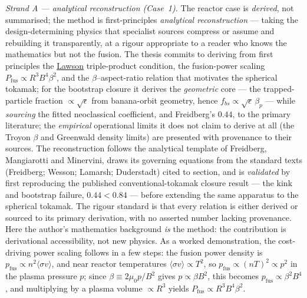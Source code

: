 \documentclass[11pt]{article}
\newcommand{\jl}[2]{\href{#2}{#1}}
\begin{document}
\emph{Strand A --- analytical reconstruction (Case~1).} The reactor case is \emph{derived}, not summarised; the method is first-principles \emph{analytical reconstruction} --- taking the design-determining physics that specialist sources compress or assume and rebuilding it transparently, at a rigour appropriate to a reader who knows the mathematics but not the fusion. The thesis commits to deriving from first principles the \jl{Lawson}{https://en.wikipedia.org/wiki/Lawson_criterion} triple-product condition, the fusion-power scaling $P_{\mathrm{fus}}\propto R^{3}B^{4}\beta^{2}$, and the $\beta$--aspect-ratio relation that motivates the spherical tokamak; for the bootstrap closure it derives the \emph{geometric} core --- the trapped-particle fraction $\propto\sqrt{\epsilon}$ from banana-orbit geometry, hence $f_{bs}\propto\sqrt{\epsilon}\,\beta_{p}$ --- while \emph{sourcing} the fitted neoclassical coefficient, and Freidberg's $0.44$, to the primary literature; the \emph{empirical} operational limits it does not claim to derive at all (the Troyon $\beta$ and Greenwald density limits) are presented with provenance to their sources. The reconstruction follows the analytical template of Freidberg, Mangiarotti and Minervini,\cite{freidberg2015} draws its governing equations from the standard texts (Freidberg; Wesson; Lamarsh; Duderstadt) cited to section, and is \emph{validated} by first reproducing the published conventional-tokamak closure result --- the kink and bootstrap failure, $0.44<0.84$ --- before extending the same apparatus to the spherical tokamak. The rigour standard is that every relation is either derived or sourced to its primary derivation, with no asserted number lacking provenance. Here the author's mathematics background \emph{is} the method: the contribution is derivational accessibility, not new physics. As a worked demonstration, the cost-driving power scaling follows in a few steps: the fusion power density is $p_{\mathrm{fus}}\propto n^{2}\langle\sigma v\rangle$, and near reactor temperatures $\langle\sigma v\rangle\propto T^{2}$, so $p_{\mathrm{fus}}\propto(nT)^{2}\propto p^{2}$ in the plasma pressure $p$; since $\beta\equiv 2\mu_{0}p/B^{2}$ gives $p\propto\beta B^{2}$, this becomes $p_{\mathrm{fus}}\propto\beta^{2}B^{4}$, and multiplying by a plasma volume $\propto R^{3}$ yields $P_{\mathrm{fus}}\propto R^{3}B^{4}\beta^{2}$.
\end{document}
